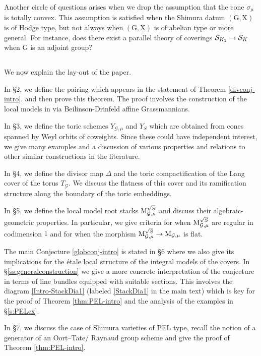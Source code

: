\documentclass[reqno, 10pt]{amsart}
\makeatletter
\newcommand{\VE}{ }
\newcommand{\CG}{\ensuremath{\mathcal {G}}\xspace}
\newcommand{\CS}{\ensuremath{\mathcal {S}}\xspace}
\newcommand{\RG}{\ensuremath{\mathrm {G}}\xspace}
\newcommand{\RX}{\ensuremath{\mathrm {X}}\xspace}
\theoremstyle{definition}
\numberwithin{equation}{subsection}
\numberwithin{subsubsection}{subsection}
\renewcommand{\to}{%
   \ifbool{@display}{\longrightarrow}{\rightarrow}%
   }
\newcommand{\Mloc}{{\rm M}}
\makeatother
\begin{document}
Another circle of questions arises when we drop the assumption that the cone $\sigma_\mu$ is totally convex. This assumption is satisfied when the Shimura datum $(\RG, \RX)$ is of Hodge type, but not always when $(\RG, \RX)$ is of abelian type or more general. For instance, does there exist a parallel theory of coverings $\CS_{K_1}\to \CS_K$ when $\RG$ is an adjoint group? 

\VE
 
 \subsection{} We now explain the lay-out of the paper. 

In \S 2, we define the pairing which appears in the statement of Theorem \ref{divconj-intro}.
 and then prove this theorem. The proof involves the construction of the local models  in \cite{PZ} via  Beilinson-Drinfeld affine Grassmannians. 
 
 In \S 3, we define the toric schemes $Y_{\CG,\mu}$ and $Y_S$ which are obtained from cones spanned by  Weyl orbits of coweights. Since these could have independent interest, 
we give many examples and a discussion of various properties and relations to other similar constructions in the literature. 

In \S 4, we define the divisor map $\Delta$ and the toric compactification of the Lang cover of the torus $T_\CG$. We  discuss   the flatness of this cover and its ramification structure along the boundary of the toric embeddings. 

In \S 5, we define the local model root stacks $\Mloc^{\sqrt{S}}_{\CG,\mu}$ and discuss their algebraic-geometric properties. In particular, we give criteria for when $\Mloc^{\sqrt{S}}_{\CG,\mu}$ are regular in codimension $1$ and for when the morphism $\Mloc^{\sqrt{S}}_{\CG,\mu}\to \Mloc_{\CG,\mu}$ is flat.

The main Conjecture \ref{globconj-intro} is stated in \S 6 where we also give its implications for the \'etale local structure of the integral models of the covers. In \S \ref{ss:generalconstruction} we give a more concrete interpretation of the conjecture in terms of line bundles equipped with suitable sections. This involves the   diagram \eqref{Intro-StackDia1} (labeled \eqref{StackDia1} in the main text) which is key for the   proof of Theorem \ref{thm:PEL-intro} and the analysis of the examples in \S \ref{s:PELex}.   

In \S 7, we discuss the case of Shimura varieties of PEL type, recall the notion of a generator of an Oort--Tate/ Raynaud group scheme and give the proof of Theorem \ref{thm:PEL-intro}. 
\end{document}
